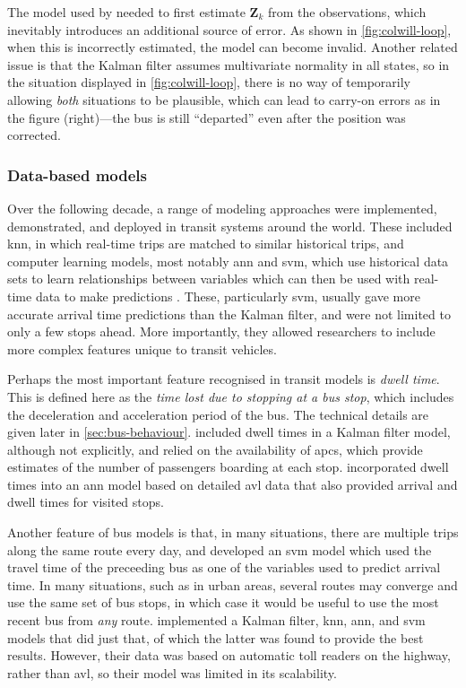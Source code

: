 \documentclass[12pt,a4paper]{article}
\newcommand{\mat}[1]{\mathbf{#1}}
\newcommand{\kf}{Kalman filter}
\begin{document}
The model used by \cite{cathey-dailey:2003} needed to first
estimate $\mat{Z}_k$ from the observations,
which inevitably introduces an additional source of error.
As shown in \cref{fig:colwill-loop}, when this is incorrectly estimated,
the model can become invalid.
Another related issue is that the \kf{} assumes multivariate normality
in all states, so in the situation displayed in \cref{fig:colwill-loop},
there is no way of temporarily allowing \emph{both} situations to be plausible,
which can lead to carry-on errors as in the figure (right)---the bus is still ``departed''
even after the position was corrected.



\subsubsection{Data-based models}
\label{sec:data-models}

Over the following decade, a range of modeling approaches were implemented, demonstrated,
and deployed in transit systems around the world.
These included \gls{knn}, in which real-time trips are matched to similar historical trips,
and computer learning models, most notably \gls{ann} and \gls{svm},
which use historical data sets to learn relationships between variables
which can then be used with real-time data to make predictions
\citep{park-rilett:1999,jeong-rilett:2005,yu-etal:2006,yu-etal:2010,yu-etal:2011}.
These, particularly \gls{svm}, usually gave more accurate arrival time
predictions than the \kf{}, and were not limited to only a few stops ahead.
More importantly, they allowed researchers to include more complex features
unique to transit vehicles.


Perhaps the most important feature recognised in transit models is \emph{dwell time}.
This is defined here as the \emph{time lost due to stopping at a bus stop},
which includes the deceleration and acceleration period of the bus.
The technical details are given later in \cref{sec:bus-behaviour}.
\cite{shalaby-farhan:2004} included dwell times in a \kf{} model,
although not explicitly,
and relied on the availability of \glspl{apc},
which provide estimates of the number of passengers boarding at each stop.
\cite{jeong-rilett:2005}
incorporated dwell times into an \gls{ann} model based on detailed \gls{avl} data
that also provided arrival and dwell times for visited stops.


Another feature of bus models is that, in many situations,
there are multiple trips along the same route every day,
and \cite{yu-etal:2006} developed an \gls{svm} model which used the travel time
of the preceeding bus as one of the variables used to predict arrival time.
In many situations, such as in urban areas,
several routes may converge and use the same set of bus stops,
in which case it would be useful to use the most recent bus from \emph{any} route.
\cite{yu-etal:2011} implemented a \kf{}, \gls{knn}, \gls{ann}, and \gls{svm} models that did just that,
of which the latter was found to provide the best results.
However, their data was based on automatic toll readers on the highway,
rather than \gls{avl},
so their model was limited in its scalability.
\end{document}
